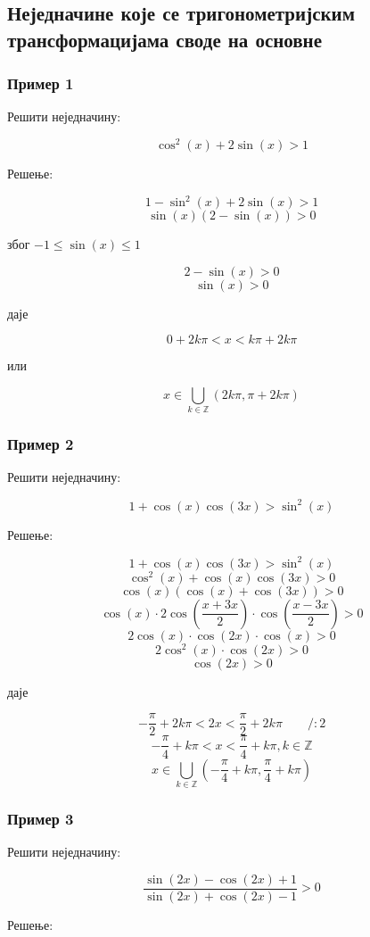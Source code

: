 \documentclass[../diplomski.tex]{subfiles}
\begin{document}
\subsection{Неједначине које се тригонометријским трансформацијама своде на основне}

\subsubsection{Пример 1}

Решити неједначину:

\[\cos^{2}(x)+2\sin(x)>1\]

Решење:

\[1-\sin^{2}(x)+2\sin(x)>1\]
\[\sin(x)(2-\sin(x))>0\]
\centerline{због $-1\le\sin(x)\le1$}
\[2-\sin(x)>0\]
\[\sin(x)>0\]
\centerline{даје}
\[0+2k\pi<x<k\pi+2k\pi\]
\centerline{или}
\[x\in\bigcup_{k\in\mathbb{Z}}(2k\pi,\pi+2k\pi)\]

\subsubsection{Пример 2}

Решити неједначину:

\[1+\cos(x)\cos(3x)>\sin^{2}(x)\]

Решење:

\[1+\cos(x)\cos(3x)>\sin^{2}(x)\]
\[\cos^{2}(x)+\cos(x)\cos(3x)>0\]
\[\cos(x)(\cos(x)+\cos(3x))>0\]
\[\cos(x)\cdot2\cos\left(\frac{x+3x}{2}\right)\cdot\cos\left(\frac{x-3x}{2}\right)>0\]
\[2\cos(x)\cdot\cos(2x)\cdot\cos(x)>0\]
\[2\cos^{2}(x)\cdot\cos(2x)>0\]
\[\cos(2x)>0\]
\centerline{даје}
\[-\frac{\pi}{2}+2k\pi<2x<\frac{\pi}{2}+2k\pi\qquad/:2\]
\[-\frac{\pi}{4}+k\pi<x<\frac{\pi}{4}+k\pi,k\in\mathbb{Z}\]
\[x\in\bigcup_{k\in\mathbb{Z}}\left(-\frac{\pi}{4}+k\pi,\frac{\pi}{4}+k\pi\right)\]


\subsubsection{Пример 3}

Решити неједначину:

\[\frac{\sin(2x)-\cos(2x)+1}{\sin(2x)+\cos(2x)-1}>0\]

Решење:
\end{document}
